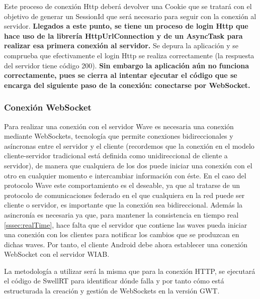 	  Este proceso de conexión Http deberá devolver una Cookie que se tratará con el objetivo de generar un SessionId que será necesario para seguir con la conexión al servidor. \textbf{Llegados a este punto, se tiene un proceso de login Http que hace uso de la librería HttpUrlConnection y de un AsyncTask para realizar esa primera conexión al servidor.} Se depura la aplicación y se comprueba que efectivamente el login Http se realiza correctamente (la respuesta del servidor tiene código 200). \textbf{Sin embargo la aplicación aún no funciona correctamente, pues se cierra al intentar ejecutar el código que se encarga del siguiente paso de la conexión: conectarse por WebSocket.}    
    
    		\subsubsection{Conexión WebSocket}\label{sssec:conWave}
    
    Para realizar una conexión con el servidor Wave es necesaria una conexión mediante WebSockets\cite{ref:webSocket_ref}, tecnología que permite conexiones bidireccionales y asíncronas entre el servidor y el cliente (recordemos que la conexión en el modelo cliente-servidor tradicional está definida como unidireccional de cliente a servidor), de manera que cualquiera de los dos puede iniciar una conexión con el otro en cualquier momento e intercambiar información con éste. En el caso del protocolo Wave este comportamiento es el deseable, ya que al tratarse de un protocolo de comunicaciones federado en el que cualquiera en la red puede ser cliente o servidor, es importante que la conexión sea bidireccional. Además la asincronía es necesaria ya que, para mantener la consistencia en tiempo real \ref{sssec:realTime}, hace falta que el servidor que contiene las waves pueda iniciar una conexión con los clientes para notificar los cambios que se produzcan en dichas waves. Por tanto, el cliente Android debe ahora establecer una conexión WebSocket con el servidor WIAB. 
    
    La metodología a utilizar será la misma que para la conexión HTTP, se ejecutará el código de SwellRT para identificar dónde falla y por tanto cómo está estructurada la creación y gestión de WebSockets en la versión GWT.
    
